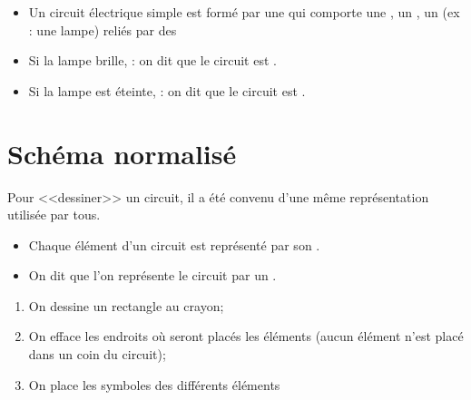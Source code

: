 \documentclass[12pt,a4paper]{article}
\begin{document}
\begin{mybilan}
	\begin{itemize}
		\item Un circuit électrique simple est formé par une  qui comporte une , un , un  (ex : une lampe) reliés par des 
		
		\item Si la lampe brille,  : on dit que le circuit est .
		
		\item Si la lampe est éteinte,  : on dit que le circuit est .
		
		
	\end{itemize}
\end{mybilan}

\section{Schéma normalisé}

\begin{mybilan}
	Pour <<dessiner>> un circuit, il a été convenu d'une même représentation utilisée par tous.

	\begin{itemize}
		\item Chaque élément d'un circuit est représenté par son .
		\item On dit que l'on représente le circuit par un .
	\end{itemize}

\end{mybilan}

\begin{mymeth}
	\begin{enumerate}
		\item On dessine un rectangle au crayon;
		\item On efface les endroits où seront placés les éléments (aucun élément n'est placé dans un coin du circuit);
		\item On place les symboles des différents éléments
	\end{enumerate}
\end{mymeth}
\end{document}
